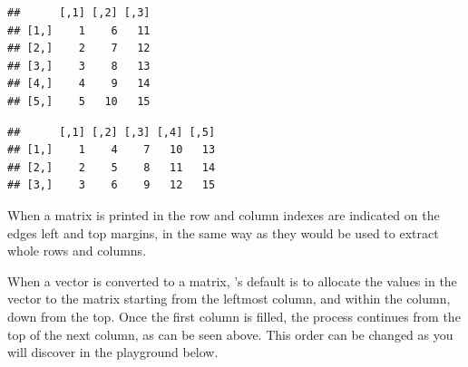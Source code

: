 \documentclass[krantz2]{krantz}\usepackage{knitr}
\begin{document}
\begin{knitrout}\footnotesize
{}\color{fgcolor}\begin{kframe}
\begin{alltt}
\hlstd{(}\hlopt{:}\hlstd{,}  \hlstd{=} \hlstd{)}
\end{alltt}
\begin{verbatim}
##      [,1] [,2] [,3]
## [1,]    1    6   11
## [2,]    2    7   12
## [3,]    3    8   13
## [4,]    4    9   14
## [5,]    5   10   15
\end{verbatim}
\begin{alltt}
\hlstd{(}\hlopt{:}\hlstd{,}  \hlstd{=} \hlstd{)}
\end{alltt}
\begin{verbatim}
##      [,1] [,2] [,3] [,4] [,5]
## [1,]    1    4    7   10   13
## [2,]    2    5    8   11   14
## [3,]    3    6    9   12   15
\end{verbatim}
\end{kframe}
\end{knitrout}

When a matrix is printed in \Rlang the row and column indexes are indicated on the edges left and top margins, in the same way as they would be used to extract whole rows and columns.

When a vector is converted to a matrix, \Rlang's default is to allocate the values in the vector to the matrix starting from the leftmost column, and within the column, down from the top. Once the first column is filled, the process continues from the top of the next column, as can be seen above. This order can be changed as you will discover in the playground below.
\end{document}
